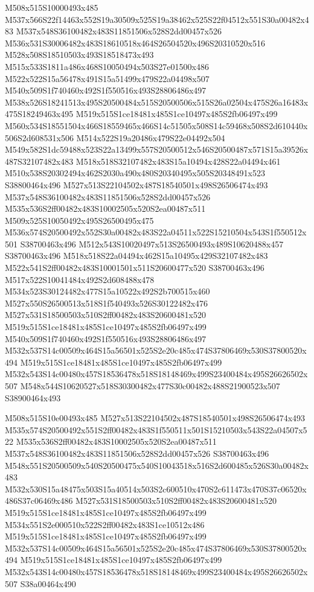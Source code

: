 \documentclass{article}
\begin{document}
\begin{multicols}{2}
M508x515S10000493x485 M537x566S22f14463x552S19a30509x525S19a38462x525S22f04512x551S30a00482x483 M537x548S36100482x483S11851506x528S2dd00457x526 M536x531S30006482x483S18610518x464S26504520x496S20310520x516 M528x508S18510503x493S18518473x493 M515x533S1811a486x468S10050494x503S27e01500x486 M522x522S15a56478x491S15a51499x479S22a04498x507 M540x509S1f740460x492S1f550516x493S28806486x497 M538x526S18241513x495S20500484x515S20500506x515S26a02504x475S26a16483x475S18249463x495 M519x515S1ce18481x485S1ce10497x485S2fb06497x499 M560x534S18551504x466S18559465x466S14c51505x508S14c59468x508S2d610440x506S2d608531x506 M514x522S19a20486x479S22e04492x504 M549x582S1dc59488x523S22a13499x557S20500512x546S20500487x571S15a39526x487S32107482x483 M518x518S32107482x483S15a10494x428S22a04494x461 M510x538S20302494x462S2030a490x480S20340495x505S20348491x523 S38800464x496 M527x513S22104502x487S18540501x498S26506474x493 M537x548S36100482x483S11851506x528S2dd00457x526 M535x536S2ff00482x483S10002505x520S2ea00487x511 M509x525S10050492x495S26500495x475 M536x574S20500492x552S30a00482x483S22a04511x522S15210504x543S1f550512x501 S38700463x496 M512x543S10020497x513S26500493x489S10620488x457 S38700463x496 M518x518S22a04494x462S15a10495x429S32107482x483 M522x541S2ff00482x483S10001501x511S20600477x520 S38700463x496 M517x522S10041484x492S2d608488x478 M534x523S30124482x477S15a10522x492S2b700515x460 M527x550S26500513x518S1f540493x526S30122482x476 M527x531S18500503x510S2ff00482x483S20600481x520 M519x515S1ce18481x485S1ce10497x485S2fb06497x499 M540x509S1f740460x492S1f550516x493S28806486x497 M532x537S14c00509x464S15a56501x525S2e20c485x474S37806469x530S37800520x494 M519x515S1ce18481x485S1ce10497x485S2fb06497x499 M532x543S14c00480x457S18536478x518S18148469x499S23400484x495S26626502x507 M548x544S10620527x518S30300482x477S30c00482x488S21900523x507 S38900464x493

M508x515S10e00493x485 M527x513S22104502x487S18540501x498S26506474x493 M535x574S20500492x551S2ff00482x483S1f550511x501S15210503x543S22a04507x522 M535x536S2ff00482x483S10002505x520S2ea00487x511 M537x548S36100482x483S11851506x528S2dd00457x526 S38700463x496 M548x551S20500509x540S20500475x540S10043518x516S2d600485x526S30a00482x483 M532x530S15a48475x503S15a40514x503S2c600510x470S2c611473x470S37c06520x486S37c06469x486 M527x531S18500503x510S2ff00482x483S20600481x520 M519x515S1ce18481x485S1ce10497x485S2fb06497x499 M534x551S2e000510x522S2ff00482x483S1ce10512x486 M519x515S1ce18481x485S1ce10497x485S2fb06497x499 M532x537S14c00509x464S15a56501x525S2e20c485x474S37806469x530S37800520x494 M519x515S1ce18481x485S1ce10497x485S2fb06497x499 M532x543S14c00480x457S18536478x518S18148469x499S23400484x495S26626502x507 S38a00464x490


\end{multicols}
\end{document}
